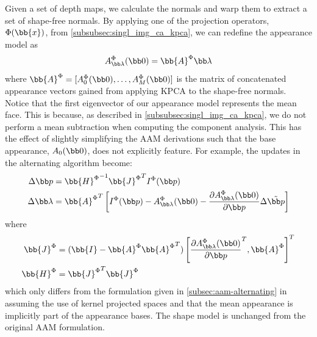 Given a set of depth maps, we calculate the normals and warp them to extract
a set of shape-free normals. By applying one of the projection operators,
$\Phi(\bb{x})$, from \cref{subsubsec:singl_img_ca_kpca}, we can
redefine the appearance model as
\begin{equation}\label{eq:aam-kernel-appearance-model}
    A_{\blambda}^{\Phi}(\zero) = \bb{A}^{\Phi} \blambda
\end{equation}
where $\bb{A}^{\Phi} = [A_0^{\Phi}(\zero), \ldots, A_M^{\Phi}(\zero)]$
is the matrix of concatenated appearance vectors gained from applying KPCA to
the shape-free normals. Notice that the first eigenvector of our appearance
model represents the mean face. This is because, as described in
\cref{subsubsec:singl_img_ca_kpca}, we do not perform a mean subtraction
when computing the component analysis. This has the effect of slightly
simplifying the AAM derivations such that the base appearance, $A_0(\zero)$,
does not explicitly feature. For example, the updates in the alternating
algorithm become:
\begin{equation}
    \begin{aligned}\label{eq:aam-kernel-alternating-update}
        \Delta \p       &= {\bb{H}^{\Phi}}^{-1} {\bb{J}^{\Phi}}^{T} I^{\Phi}(\p) \\
        \Delta \blambda &= {\bb{A}^{\Phi}}^T \left[ I^{\Phi}(\p) - A^{\Phi}_{\blambda}(\zero) - \frac{\partial A^{\Phi}_{\blambda}(\zero)}{\partial \p} \Delta \tilde{\p} \right]
    \end{aligned}
\end{equation}
where
\begin{equation*}
    \begin{aligned}
        \bb{J}^{\Phi} &= (\bb{I} - \bb{A}^{\Phi} {\bb{A}^{\Phi}}^T) \left[ {\frac{\partial A^{\Phi}_{\blambda}(\zero)}{\partial \p}}^T, \bb{A}^{\Phi} \right]^T \\
        \bb{H}^{\Phi} &= {\bb{J}^{\Phi}}^{T} \bb{J}^{\Phi}
    \end{aligned}
\end{equation*}
which only differs from the formulation given in \cref{subsec:aam-alternating} in assuming the use of kernel projected spaces and that the mean
appearance is implicitly part of the appearance bases. The shape model is
unchanged from the original AAM formulation.

